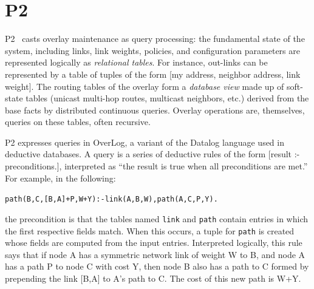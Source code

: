 \documentclass[10pt,twocolumn]{article}
\def\Sys{P2\xspace}
\def\Lang{OverLog\xspace}
\newenvironment{overlog}{\begin{alltt}\footnotesize}{\end{alltt}}
\newcommand{\ol}[1]{{\tt\footnotesize#1}}
\begin{document}
% 
% 
% 
% 





\section{\Sys}
\label{sec:P2}

\Sys~\cite{Loo2005SOSP} casts overlay maintenance as 
query processing: the fundamental state of the system, including
links, link weights, policies, and configuration parameters are
represented logically as \emph{relational tables}.  For instance,
out-links can be represented by a table of tuples of the form [my
address, neighbor address, link weight].  The routing tables of the
overlay form a \textit{database view} made up of soft-state
tables (unicast multi-hop routes, multicast neighbors, etc.) derived
from the base facts by distributed continuous queries. 
Overlay operations are, themselves, queries on these tables, often
recursive. 

\Sys expresses queries in \Lang, a variant of the
Datalog language used in deductive databases. A query is a series of deductive
rules of the form [result :- preconditions.], interpreted as ``the
result is true when all preconditions are met.''
For example, in the following:
\begin{overlog}
path(B,C,[B,A]+P,W+Y) :- link(A,B,W),path(A,C,P,Y).
\end{overlog}
the precondition is that the tables named \ol{link} and \ol{path} contain
entries in which the first respective fields match.  When
this occurs, a tuple for \ol{path} is created whose fields are
computed from the input entries. Interpreted logically,
this rule says that if node A has a symmetric network link of weight W
to B, and node A has a path P to node C with cost Y, then node B also
has a path to C formed by prepending the link [B,A] to A's path to
C. The cost of this new path is W+Y.
\end{document}
